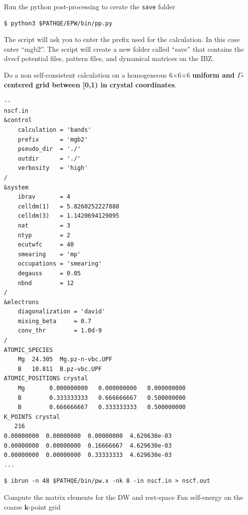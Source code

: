 \documentclass[a4paper,11pt,serif]{article}
\newcommand{\mb}[1]{\mathbf{#1}}
\begin{document}
\vspace{0.5cm}
\action Run the python post-processing to create the \texttt{save} folder
\begin{verbatim}
$ python3 $PATHQE/EPW/bin/pp.py
\end{verbatim}
The script will ask you to enter the prefix used for the calculation. In this case enter ``mgb2''.
The script will create a new folder called ``save'' that contains the dvscf potential files, pattern files, and dynamical
matrices on the IBZ.


\vspace{0.5cm}
\action Do a non self-consistent calculation on a homogeneous 6$\times$6$\times$6 \textbf{uniform and $\Gamma$-centered grid between [0,1) in crystal coordinates}.


\begin{scriptsize}
 \begin{Verbatim}[frame=single]
--                                                                                                 nscf.in
&control
    calculation = 'bands'
    prefix      = 'mgb2'
    pseudo_dir  = './'
    outdir      = './'
    verbosity   = 'high'
/
&system
    ibrav       = 4
    celldm(1)   = 5.8260252227888
    celldm(3)   = 1.1420694129095
    nat         = 3
    ntyp        = 2
    ecutwfc     = 40
    smearing    = 'mp'
    occupations = 'smearing'
    degauss     = 0.05
    nbnd        = 12
/
&electrons
    diagonalization = 'david'
    mixing_beta     = 0.7
    conv_thr        = 1.0d-9
/
ATOMIC_SPECIES
    Mg  24.305  Mg.pz-n-vbc.UPF
    B   10.811  B.pz-vbc.UPF
ATOMIC_POSITIONS crystal
    Mg       0.000000000   0.000000000   0.000000000
    B        0.333333333   0.666666667   0.500000000
    B        0.666666667   0.333333333   0.500000000
K_POINTS crystal
   216
0.00000000  0.00000000  0.00000000  4.629630e-03
0.00000000  0.00000000  0.16666667  4.629630e-03
0.00000000  0.00000000  0.33333333  4.629630e-03
...
\end{Verbatim}
\end{scriptsize}


\begin{verbatim}
$ ibrun -n 48 $PATHQE/bin/pw.x -nk 8 -in nscf.in > nscf.out
\end{verbatim}


\vspace{0.5cm}
\action Compute the matrix elements for the DW and rest-space Fan self-energy on the coarse $\mb{k}$-point grid
\end{document}
